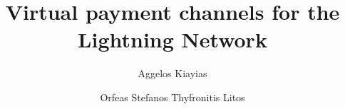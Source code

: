 \title{Virtual payment channels for the Lightning Network}
\author{Aggelos Kiayias \and Orfeas Stefanos Thyfronitis Litos}
\maketitle
